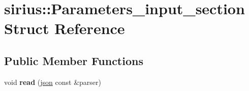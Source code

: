 \hypertarget{structsirius_1_1_parameters__input__section}{}\section{sirius\+:\+:Parameters\+\_\+input\+\_\+section Struct Reference}
\label{structsirius_1_1_parameters__input__section}
\subsection*{Public Member Functions}
\begin{DoxyCompactItemize}
\item 
\hypertarget{structsirius_1_1_parameters__input__section_a6f12cd348846abb0a3a918146792b4ee}{}void {\bfseries read} (\hyperlink{classnlohmann_1_1basic__json}{json} const \&parser)\label{structsirius_1_1_parameters__input__section_a6f12cd348846abb0a3a918146792b4ee}

\end{DoxyCompactItemize}
